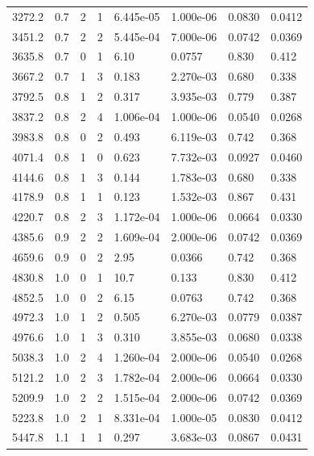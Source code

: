 \documentclass[preview]{standalone}
\begin{document}
{{{\begin{tabular}{L{1.2cm}C{1.2cm} C{0.3cm}C{0.5cm} C{1.4cm}C{1.4cm} C{1.4cm}C{1.4cm}}
  3272.2  &   0.7  & 2     &  1 &  6.445e-05  & 1.000e-06  & 0.0830 &  0.0412   \\ 
  3451.2  &   0.7  & 2     &  2 &  5.445e-04  & 7.000e-06  & 0.0742 &  0.0369   \\ 
  3635.8  &   0.7  & 0     &  1 &  6.10  & 0.0757  & 0.830 &  0.412   \\ 
  3667.2  &   0.7  & 1     &  3 &  0.183  & 2.270e-03  & 0.680 &  0.338   \\ 
  3792.5  &   0.8  & 1     &  2 &  0.317  & 3.935e-03  & 0.779 &  0.387   \\ 
  3837.2  &   0.8  & 2     &  4 &  1.006e-04  & 1.000e-06  & 0.0540 &  0.0268   \\ 
  3983.8  &   0.8  & 0     &  2 &  0.493  & 6.119e-03  & 0.742 &  0.368   \\ 
  4071.4  &   0.8  & 1     &  0 &  0.623  & 7.732e-03  & 0.0927 &  0.0460   \\ 
  4144.6  &   0.8  & 1     &  3 &  0.144  & 1.783e-03  & 0.680 &  0.338   \\ 
  4178.9  &   0.8  & 1     &  1 &  0.123  & 1.532e-03  & 0.867 &  0.431   \\ 
  4220.7  &   0.8  & 2     &  3 &  1.172e-04  & 1.000e-06  & 0.0664 &  0.0330   \\ 
  4385.6  &   0.9  & 2     &  2 &  1.609e-04  & 2.000e-06  & 0.0742 &  0.0369   \\ 
  4659.6  &   0.9  & 0     &  2 &  2.95  & 0.0366  & 0.742 &  0.368   \\ 
  4830.8  &   1.0  & 0     &  1 &  10.7  & 0.133  & 0.830 &  0.412   \\ 
  4852.5  &   1.0  & 0     &  2 &  6.15  & 0.0763  & 0.742 &  0.368   \\ 
  4972.3  &   1.0  & 1     &  2 &  0.505  & 6.270e-03  & 0.0779 &  0.0387   \\ 
  4976.6  &   1.0  & 1     &  3 &  0.310  & 3.855e-03  & 0.0680 &  0.0338   \\ 
  5038.3  &   1.0  & 2     &  4 &  1.260e-04  & 2.000e-06  & 0.0540 &  0.0268   \\ 
  5121.2  &   1.0  & 2     &  3 &  1.782e-04  & 2.000e-06  & 0.0664 &  0.0330   \\ 
  5209.9  &   1.0  & 2     &  2 &  1.515e-04  & 2.000e-06  & 0.0742 &  0.0369   \\ 
  5223.8  &   1.0  & 2     &  1 &  8.331e-04  & 1.000e-05  & 0.0830 &  0.0412   \\ 
  5447.8  &   1.1  & 1     &  1 &  0.297  & 3.683e-03  & 0.0867 &  0.0431   \\ 

\end{tabular}}}}
\end{document}
